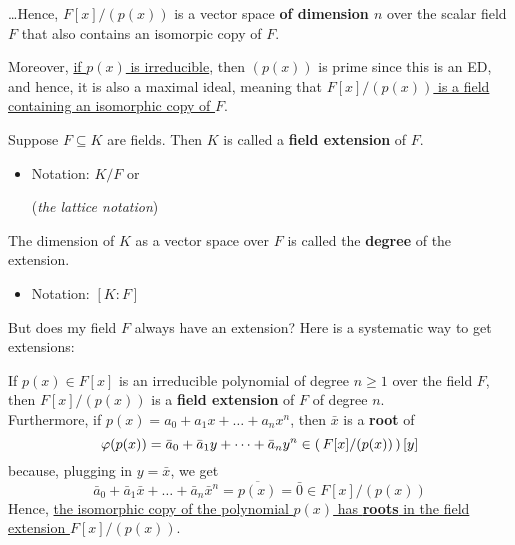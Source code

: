 \documentclass[12pt]{article}
\begin{document}
\dots Hence, $F[x]/(p(x))$ is a vector space \textbf{of dimension $n$} over the scalar field $F$ that also contains an isomorpic copy of $F$.

Moreover, \uline{if $p(x)$ is irreducible}, then $(p(x))$ is prime since this is an ED, and hence, it is also a maximal ideal, meaning that \uline{$F[x]/(p(x))$ is a field containing an isomorphic copy of $F$}.

 Suppose $F\subseteq K$ are fields. Then $K$ is called a \textbf{field extension} of $F$.
\begin{itemize}
    \item Notation: $K/F$ or  (\textit{the lattice notation})
\end{itemize}
The dimension of $K$ as a vector space over $F$ is called the \textbf{degree} of the extension.
\begin{itemize}
    \item Notation: $[K:F]$
\end{itemize}

But does my field $F$ always have an extension? Here is a systematic way to get extensions:

\eg If $p(x)\in F[x]$ is an irreducible polynomial of degree $n\geq 1$ over the field $F$, then $F[x]/(p(x))$ is a \textbf{field extension} of $F$ of degree $n$.\\ Furthermore, if $p(x)=a_0+a_1x+\dots +a_nx^n$, then $\bar x$ is a \textbf{root} of $$\varphi (p(x))=\bar a_0+\bar a_1y + \dots + \bar a_ny^n\in \left(\,F[x]/(p(x))\,\right)[y]$$ because, plugging in $y=\bar x$, we get \begin{equation*}
    \bar a_0+\bar a_1\bar x + \dots + \bar a_n\bar x^n= \overline{p(x)}=\bar 0 \in F[x]/(p(x))
\end{equation*}
Hence, \uline{the isomorphic copy of the polynomial $p(x)$ has \textbf{roots} in the field extension $F[x]/(p(x))$}.
\end{document}
